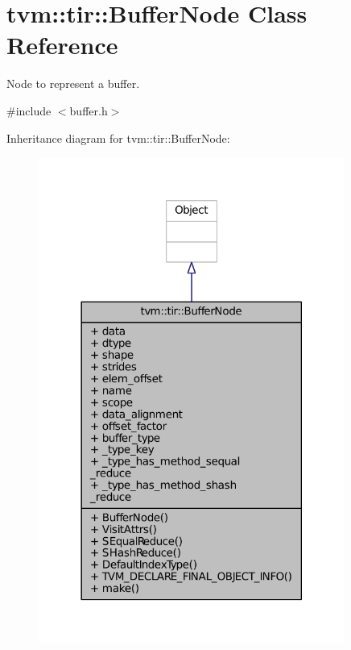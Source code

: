 \hypertarget{classtvm_1_1tir_1_1BufferNode}{}\section{tvm\+:\+:tir\+:\+:Buffer\+Node Class Reference}
\label{classtvm_1_1tir_1_1BufferNode}


Node to represent a buffer.  




{\ttfamily \#include $<$buffer.\+h$>$}



Inheritance diagram for tvm\+:\+:tir\+:\+:Buffer\+Node\+:
\nopagebreak
\begin{figure}[H]
\begin{center}
\leavevmode
\includegraphics[width=285pt]{classtvm_1_1tir_1_1BufferNode__inherit__graph}
\end{center}
\end{figure}


